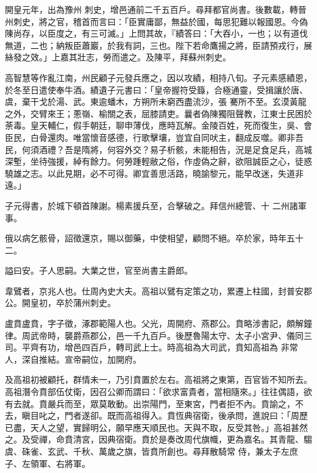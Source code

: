 \begin{pinyinscope}
 開皇元年，出為豫州
 刺史，增邑通前二千五百戶。尋拜都官尚書。後數載，轉晉州刺史，將之官，稽首而言曰：「臣實庸鄙，無益於國，每思犯難以報國恩。今偽陳尚存，以臣度之，有三可滅。」上問其故，『績答曰：「大吞小，一也；以有道伐無道，二也；納叛臣蕭巖，於我有詞，三也。陛下若命鷹揚之將，臣請預戎行，展絲發之效。」上嘉其壯志，勞而遣之。及陳平，拜蘇州刺史。



 高智慧等作亂江南，州民顧子元發兵應之，因以攻績，相持八旬。子元素感績恩，於冬至日遣使奉牛酒。績遺子元書曰：「皇帝握符受籙，合極通靈，受揖讓於唐、虞，棄干戈於湯、武。東逾蟠木，方朔所未窮西盡流沙，張
 騫所不至。玄漠黃龍之外，交臂來王；蔥嶺、榆關之表，屈膝請吏。曩者偽陳獨阻聲教，江東士民困於荼毒。皇天輔仁，假手朝廷，聊申薄伐，應時瓦解。金陵百姓，死而復生，吳、會臣民，白骨還肉。唯當懷音感德，行歌擊壤，豈宜自同吠主，翻成反噬。卿非吾民，何須酒禮？吾是隋將，何容外交？易子析骸，未能相告，況是足食足兵，高城深塹，坐待強援，綽有餘力。何勞踵輕敝之俗，作虛偽之辭，欲阻誠臣之心，徒惑驍雄之志。以此見期，必不可得。卿宜善思活路，曉諭黎元，能早改迷，失道非遠。」



 子元得書，於城下頓首陳謝。楊素援兵至，合擊破之。拜信州總管、十
 二州諸軍事。



 俄以病乞骸骨，詔徵還京，賜以御藥，中使相望，顧問不絕。卒於家，時年五十二。



 謚曰安。子人思嗣。大業之世，官至尚書主爵郎。



 韋鷿者，京兆人也。仕周內史大夫。高祖以鷿有定策之功，累遷上柱國，封普安郡公。開皇初，卒於蒲州刺史。



 盧賁盧賁，字子徵，涿郡範陽人也。父光，周開府、燕郡公。賁略涉書記，頗解鐘律。周武帝時，襲爵燕郡公，邑一千九百戶。後歷魯陽太守、太子小宮尹、儀同三司。平齊有功，增邑四百戶，轉司武上士。時高祖為大司武，賁知高祖為
 非常人，深自推結。宣帝嗣位，加開府。



 及高祖初被顧托，群情未一，乃引賁置於左右。高祖將之東第，百官皆不知所去。高祖潛令賁部伍仗衛，因召公卿而謂曰：「欲求富貴者，當相隨來。」往往偶語，欲有去就。賁嚴兵而至，眾莫敢動。出崇陽門，至東宮，門者拒不內。賁諭之，不去，瞋目叱之，門者遂卻。既而高祖得入。賁恆典宿衛，後承問，進說曰：「周歷已盡，天人之望，實歸明公，願早應天順民也。天與不取，反受其咎。」高祖甚然之。及受禪，命賁清宮，因典宿衛。賁於是奏改周代旗幟，更為嘉名。其青龍、騶虞、硃雀、玄武、千秋、萬歲之旗，皆賁所創也。尋拜散騎常
 侍，兼太子左庶子、左領軍、右將軍。




\end{pinyinscope}
